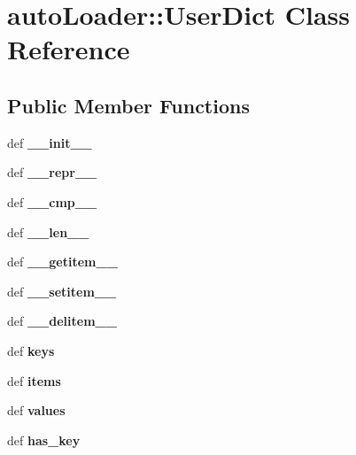 \section{auto\-Loader::User\-Dict Class Reference}
\label{classautoLoader_1_1UserDict}
\subsection*{Public Member Functions}
\begin{CompactItemize}
\item 
def \textbf{\_\-\_\-init\_\-\_\-}\label{classautoLoader_1_1UserDict_f3479a330743164ac42c0614ad3d7fdb}

\item 
def \textbf{\_\-\_\-repr\_\-\_\-}\label{classautoLoader_1_1UserDict_bfe58f769f3a894978c693f40c944cec}

\item 
def \textbf{\_\-\_\-cmp\_\-\_\-}\label{classautoLoader_1_1UserDict_d3d690836033a91d2d001ed908c4790a}

\item 
def \textbf{\_\-\_\-len\_\-\_\-}\label{classautoLoader_1_1UserDict_90bcd535e7934a7d34d1432734eabfd4}

\item 
def \textbf{\_\-\_\-getitem\_\-\_\-}\label{classautoLoader_1_1UserDict_d035a626230ba56912779427ec634eb7}

\item 
def \textbf{\_\-\_\-setitem\_\-\_\-}\label{classautoLoader_1_1UserDict_7e55cb7c77a92f25bf6134d85981ad23}

\item 
def \textbf{\_\-\_\-delitem\_\-\_\-}\label{classautoLoader_1_1UserDict_d75da32f9d0480eec739c527c285ffaf}

\item 
def \textbf{keys}\label{classautoLoader_1_1UserDict_a86511e267a538229efc85f3a454fe6a}

\item 
def \textbf{items}\label{classautoLoader_1_1UserDict_452b092fba0b7508d4abac71ff1a4939}

\item 
def \textbf{values}\label{classautoLoader_1_1UserDict_98fa26c41c1d55c6d06ed2df222a525c}

\item 
def \textbf{has\_\-key}\label{classautoLoader_1_1UserDict_b8f1844abe33a10d7c6e99b83d6f4133}

\end{CompactItemize}
